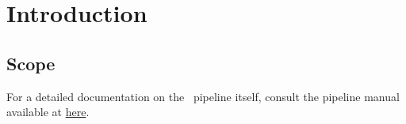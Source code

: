 \section{Introduction}

\subsection{Scope}


For a detailed documentation on the \instname\ pipeline itself,
consult the pipeline manual available at
\href{http://ftp.eso.org/pub/dfs/pipelines/instruments/muse/muse-pipeline-manual-2.10.16.pdf}{here}.

